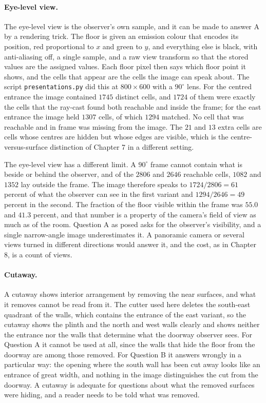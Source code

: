 \paragraph{Eye-level view.} The eye-level view is the observer's own sample, and it can be made to answer A by a rendering trick. The floor is given an emission colour that encodes its position, red proportional to $x$ and green to $y$, and everything else is black, with anti-aliasing off, a single sample, and a raw view transform so that the stored values are the assigned values. Each floor pixel then says which floor point it shows, and the cells that appear are the cells the image can speak about. The script \texttt{presentations.py} did this at $800\times600$ with a $90^\circ$ lens. For the centred entrance the image contained $1745$ distinct cells, and $1724$ of them were exactly the cells that the ray-cast found both reachable and inside the frame; for the east entrance the image held $1307$ cells, of which $1294$ matched. No cell that was reachable and in frame was missing from the image. The $21$ and $13$ extra cells are cells whose centres are hidden but whose edges are visible, which is the centre-versus-surface distinction of Chapter 7 in a different setting.

The eye-level view has a different limit. A $90^\circ$ frame cannot contain what is beside or behind the observer, and of the $2806$ and $2646$ reachable cells, $1082$ and $1352$ lay outside the frame. The image therefore speaks to $1724/2806=61$ percent of what the observer can see in the first variant and $1294/2646=49$ percent in the second. The fraction of the floor visible within the frame was $55.0$ and $41.3$ percent, and that number is a property of the camera's field of view as much as of the room. Question A as posed asks for the observer's visibility, and a single narrow-angle image underestimates it. A panoramic camera or several views turned in different directions would answer it, and the cost, as in Chapter 8, is a count of views.

\paragraph{Cutaway.} A cutaway shows interior arrangement by removing the near surfaces, and what it removes cannot be read from it. The cutter used here deletes the south-east quadrant of the walls, which contains the entrance of the east variant, so the cutaway shows the plinth and the north and west walls clearly and shows neither the entrance nor the walls that determine what the doorway observer sees. For Question A it cannot be used at all, since the walls that hide the floor from the doorway are among those removed. For Question B it answers wrongly in a particular way: the opening where the south wall has been cut away looks like an entrance of great width, and nothing in the image distinguishes the cut from the doorway. A cutaway is adequate for questions about what the removed surfaces were hiding, and a reader needs to be told what was removed.

